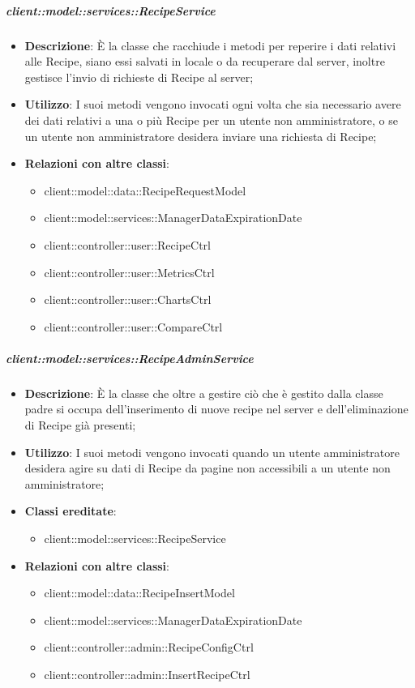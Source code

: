 \begin{itemize}
		\subparagraph{client::model::services::RecipeService} %
		\label{subp:client_model_services_recipeservice}
			\begin{itemize}
				\item \textbf{Descrizione}: È la classe che racchiude i metodi per reperire i dati relativi alle Recipe, siano essi salvati in locale o da recuperare dal server, inoltre gestisce l'invio di richieste di Recipe al server;
				\item \textbf{Utilizzo}: I suoi metodi vengono invocati ogni volta che sia necessario avere dei dati relativi a una o più Recipe per un utente non amministratore, o se un utente non amministratore desidera inviare una richiesta di Recipe;
				\item \textbf{Relazioni con altre classi}: 					
					\begin{itemize}
						\item client::model::data::RecipeRequestModel
						\item client::model::services::ManagerDataExpirationDate
						\item client::controller::user::RecipeCtrl
						\item client::controller::user::MetricsCtrl
						\item client::controller::user::ChartsCtrl						
						\item client::controller::user::CompareCtrl
					\end{itemize}
			\end{itemize}

		\subparagraph{client::model::services::RecipeAdminService} %
		\label{subp:client_model_services_recipeadminservice}
			\begin{itemize}
				\item \textbf{Descrizione}: È la classe che oltre a gestire ciò che è gestito dalla classe padre si occupa dell'inserimento di nuove recipe nel server e dell'eliminazione di Recipe già presenti;
				\item \textbf{Utilizzo}: I suoi metodi vengono invocati quando un utente amministratore desidera agire su dati di Recipe da pagine non accessibili a un utente non amministratore;
				\item \textbf{Classi ereditate}:					
					\begin{itemize}
						\item client::model::services::RecipeService
					\end{itemize}
				\item \textbf{Relazioni con altre classi}:
					\begin{itemize}
						\item client::model::data::RecipeInsertModel
						\item client::model::services::ManagerDataExpirationDate
						\item client::controller::admin::RecipeConfigCtrl
						\item client::controller::admin::InsertRecipeCtrl
					\end{itemize}
			\end{itemize}



\end{itemize}

